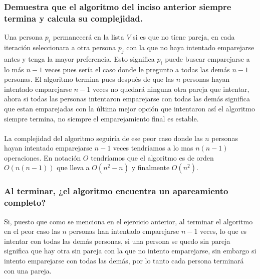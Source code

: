 \documentclass[12pt]{article}
\begin{document}
\subsubsection{Demuestra que el algoritmo del inciso anterior siempre termina y calcula su complejidad.}
Una persona $p_{i}$ permanecerá en la lista $V$ si es que no tiene pareja, en cada iteración seleccionara a otra persona $p_{j}$ con la que no haya intentado emparejarse antes y tenga la mayor preferencia. Esto significa $p_{i}$ puede buscar emparejarse a lo más $n - 1$ veces pues sería el caso donde le pregunto a todas las demás $n-1$  personas. El algoritmo termina pues después de que las $n$ personas hayan intentado emparejarse $n-1$ veces no quedará ninguna otra pareja que intentar, ahora si todas las personas intentaron emparejarse con todas las demás significa que estan emparejadas con la última mejor opción que intentaron así el algoritmo siempre termina, no siempre el emparejamiento final es estable. 
\paragraph{}
La complejidad del algoritmo seguiría de ese peor caso donde  las $n$ personas hayan intentado emparejarse $n-1$ veces tendríamos a lo mas $n(n-1)$ operaciones. 
En notación $O$ tendríamos que el algoritmo es de orden $O(n(n-1))$ que lleva a 
$O(n^{2} - n)$ y finalmente $O(n^{2})$.
\subsubsection{Al terminar, ¿el algoritmo encuentra un apareamiento completo?}
Si, puesto que como se menciona en el ejercicio anterior, al terminar el algoritmo en el peor caso las $n$ personas han intentado emparejarse $n-1$ veces, lo que es intentar con todas las demás personas, si una persona se quedo sin pareja significa que hay otra sin pareja con la que no intento emparejarse, sin embargo si intento emparejarse con todas las demás, por lo tanto cada persona terminará con una pareja.
\pagebreak
\end{document}
